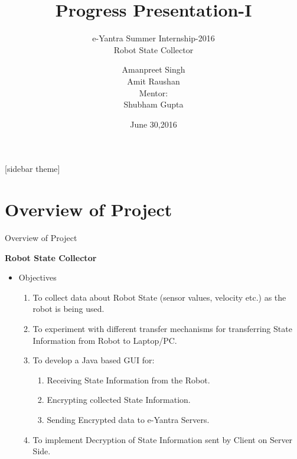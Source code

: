 \documentclass[10pt, a4paper]{beamer}
\begin{document}
	\title{Progress Presentation-I}
	\subtitle{e-Yantra Summer Internship-2016 \\ Robot State Collector}
	\author{Amanpreet Singh\\Amit Raushan\\
	 Mentor:\\ Shubham Gupta}
	\date{June 30,2016}
	\frame{\titlepage}

[sidebar theme]
\section{Overview of Project}
\begin{frame}{Overview of Project}
\begin{flushleft}
	{\Large \bf Robot State Collector}\\
	\begin{itemize}
		\item Objectives
       \begin{enumerate}
                  \item  To collect data about Robot State (sensor values, velocity etc.) as the robot is being used.
                      \item To experiment with different transfer mechanisms for transferring State Information from Robot to Laptop/PC.
                          \item To develop a Java based GUI for:
                            \begin{enumerate}
                                \item Receiving State Information from the Robot.
                                \item Encrypting collected State Information.
                                \item Sending Encrypted data to e-Yantra Servers.
                            \end{enumerate}
                          \item To implement Decryption of State Information sent by Client on Server Side.
        \end{enumerate}
    \end{itemize}
\end{flushleft}
\end{frame}
\end{document}
